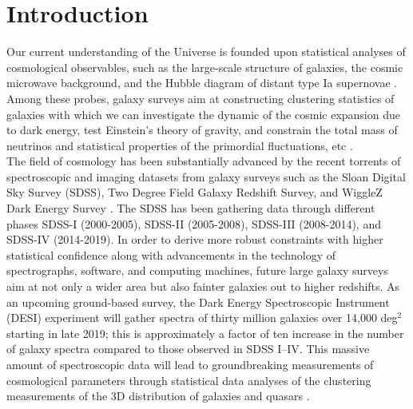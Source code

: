 \documentclass[fleqn, usenatbib]{mnras}
\begin{document}
\section{Introduction}\label{sec:intro}
Our current understanding of the Universe is founded upon statistical analyses of cosmological observables, such as the large-scale structure of galaxies, the cosmic microwave background, and the Hubble diagram of distant type Ia supernovae \citep[e.g.,][]{efstathiou1988analysis, fisher1993power, smoot1992structure, mather1994measurement,riess1998observational, perlmutter1999measurements, ata2017clustering, BOSSfinal, jones2018measuring, akrami2018planck, Elvin18}. Among these probes, galaxy surveys aim at constructing clustering statistics of galaxies with which we can investigate the dynamic of the cosmic expansion due to dark energy, test Einstein's theory of gravity, and constrain the total mass of neutrinos and statistical properties of the primordial fluctuations, etc \citep{peebles1973statistical,kaiser1987clustering,mukhanov1992theory,hamilton1998linear,eisenstein1998cosmic,seo2003probing,eisenstein2005dark,sanchez2008best, dalal2008imprints}.\\

The field of cosmology has been substantially advanced by the recent torrents of spectroscopic and imaging datasets from galaxy surveys such as the Sloan Digital Sky Survey (SDSS), Two Degree Field Galaxy Redshift Survey, and WiggleZ Dark Energy Survey \citep{york2000sloan, colless20012df, drinkwater2010wigglez}. The SDSS has been gathering data through different phases SDSS-I (2000-2005), SDSS-II (2005-2008), SDSS-III (2008-2014), and SDSS-IV (2014-2019). In order to derive more robust constraints with higher statistical confidence along with advancements in the technology of spectrographs, software, and computing machines, future large galaxy surveys aim at not only a wider area but also fainter galaxies out to higher redshifts. As an upcoming ground-based survey, the Dark Energy Spectroscopic Instrument (DESI) experiment will gather spectra of thirty million galaxies over 14,000 deg$^{2}$ starting in late 2019; this is approximately a factor of ten increase in the number of galaxy spectra compared to those observed in SDSS I--IV. This massive amount of spectroscopic data will lead to groundbreaking measurements of cosmological parameters through statistical data analyses of the clustering measurements of the 3D distribution of galaxies and quasars \citep{aghamousa2016desi}.\\ 
\end{document}
